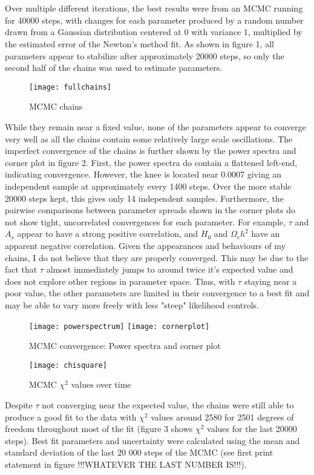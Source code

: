 \documentclass{article}
\newcommand{\<}[1]{\left\langle #1 \right\rangle }
\begin{document}
\section{}
Over multiple different iterations, the best results were from an MCMC running for 40000 steps, with changes for each parameter produced by a random number drawn from a Gaussian distribution centered at 0 with variance 1, multiplied by the estimated error of the Newton's method fit. As shown in figure 1, all parameters appear to stabilize after approximately 20000 steps, so only the second half of the chains was used to estimate parameters. 
\begin{figure}[h]
	\caption{MCMC chains}
	\centering
	\texttt{[image: fullchains]}
\end{figure}
While they remain near a fixed value, none of the parameters appear to converge very well as all the chains contain some relatively large scale oscillations. The imperfect convergence of the chains is further shown by the power spectra and corner plot in figure 2. First, the power spectra do contain a flattened left-end, indicating convergence. However, the knee is located near 0.0007 giving an independent sample at approximately every 1400 steps. Over the more stable 20000 steps kept, this gives only 14 independent samples. Furthermore, the pairwise comparisons between parameter spreads shown in the corner plots do not show tight, uncorrelated convergences for each parameter. For example, $\tau$ and $A_s$ appear to have a strong positive correlation, and $H_0$ and $\Omega_c h^2$ have an apparent negative correlation. Given the appearances and behaviours of my chains, I do not believe that they are properly converged. This may be due to the fact that $\tau$ almost immediately jumps to around twice it's expected value and does not explore other regions in parameter space. Thus, with $\tau$ staying near a poor value, the other parameters are limited in their convergence to a best fit and may be able to vary more freely with less "steep" likelihood controls. 
\begin{figure}[h]
	\caption{MCMC convergence: Power spectra and corner plot}
	\centering
	\texttt{[image: powerspectrum]}
	\texttt{[image: cornerplot]}
\end{figure}
\begin{figure}[h]
	\caption{MCMC $\chi^2$ values over time}
	\centering
	\texttt{[image: chisquare]}
\end{figure}
Despite $\tau$ not converging near the expected value, the chains were still able to produce a good fit to the data with $\chi^2$ values around 2580 for 2501 degrees of freedom throughout most of the fit (figure 3 shows $\chi^2$ values for the last 20000 steps). Best fit parameters and uncertainty were calculated using the mean and standard deviation of the last 20 000 steps of the MCMC (see first print statement in figure !!!WHATEVER THE LAST NUMBER IS!!!).
\end{document}
